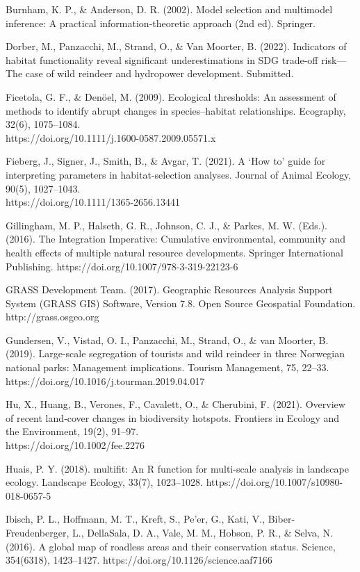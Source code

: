 \documentclass[titlepage]{article}
\begin{document}
Burnham, K. P., & Anderson, D. R. (2002). Model selection and multimodel inference: A practical information-theoretic approach (2nd ed). Springer.

Dorber, M., Panzacchi, M., Strand, O., & Van Moorter, B. (2022). Indicators of habitat functionality reveal significant underestimations in SDG trade-off risk—The case of wild reindeer and hydropower development. Submitted.

Ficetola, G. F., & Denöel, M. (2009). Ecological thresholds: An assessment of methods to identify abrupt changes in species–habitat relationships. Ecography, 32(6), 1075–1084.\\ https://doi.org/10.1111/j.1600-0587.2009.05571.x

Fieberg, J., Signer, J., Smith, B., & Avgar, T. (2021). A ‘How to’ guide for interpreting parameters in habitat‐selection analyses. Journal of Animal Ecology, 90(5), 1027–1043.\\ https://doi.org/10.1111/1365-2656.13441

Gillingham, M. P., Halseth, G. R., Johnson, C. J., & Parkes, M. W. (Eds.). (2016). The Integration Imperative: Cumulative environmental, community and health effects of multiple natural resource developments. Springer International Publishing. https://doi.org/10.1007/978-3-319-22123-6

GRASS Development Team. (2017). Geographic Resources Analysis Support System (GRASS GIS) Software, Version 7.8. Open Source Geospatial Foundation. http://grass.osgeo.org

Gundersen, V., Vistad, O. I., Panzacchi, M., Strand, O., & van Moorter, B. (2019). Large-scale segregation of tourists and wild reindeer in three Norwegian national parks: Management implications. Tourism Management, 75, 22–33. https://doi.org/10.1016/j.tourman.2019.04.017

Hu, X., Huang, B., Verones, F., Cavalett, O., & Cherubini, F. (2021). Overview of recent land‐cover changes in biodiversity hotspots. Frontiers in Ecology and the Environment, 19(2), 91–97. \\ https://doi.org/10.1002/fee.2276

Huais, P. Y. (2018). multifit: An R function for multi-scale analysis in landscape ecology. Landscape Ecology, 33(7), 1023–1028. https://doi.org/10.1007/s10980-018-0657-5

Ibisch, P. L., Hoffmann, M. T., Kreft, S., Pe’er, G., Kati, V., Biber-Freudenberger, L., DellaSala, D. A., Vale, M. M., Hobson, P. R., & Selva, N. (2016). A global map of roadless areas and their conservation status. Science, 354(6318), 1423–1427. https://doi.org/10.1126/science.aaf7166
\end{document}
